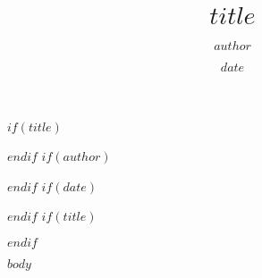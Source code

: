 \documentclass[11pt]{article}
\begin{document}
$if(title)$
\title{$title$}
$endif$
$if(author)$
\author{$author$}
$endif$
$if(date)$
\date{$date$}
$endif$
$if(title)$
\maketitle
$endif$

$body$
\end{document}
